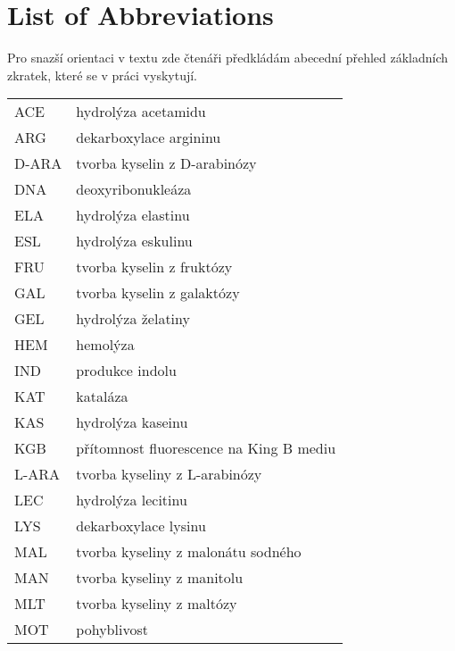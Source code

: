 \chapter*{List of Abbreviations}
\renewcommand{\chaptername}{Abbreviations}

Pro snazší orientaci v textu zde čtenáři předkládám abecední přehled základních zkratek, které se v práci vyskytují.
\begin{flushleft}
\begin{longtable}[l]{ll} %
  ACE                 & hydrolýza acetamidu \\[1mm]
  ARG                 & dekarboxylace argininu \\[1mm]
  D-ARA                 & tvorba kyselin z D-arabinózy \\[1mm]
  DNA                 & deoxyribonukleáza \\[1mm]
  ELA                 & hydrolýza elastinu \\[1mm]
  ESL                 & hydrolýza eskulinu \\[1mm]
  FRU                 & tvorba kyselin z fruktózy \\[1mm]
  GAL                 & tvorba kyselin z galaktózy \\[1mm]
  GEL                 & hydrolýza želatiny \\[1mm]
  HEM                 & hemolýza \\[1mm]
  IND                 & produkce indolu \\[1mm]
  KAT                 & kataláza \\[1mm]
  KAS                 & hydrolýza kaseinu \\[1mm]
  KGB                 & přítomnost fluorescence na King B mediu \\[1mm]
  L-ARA                 & tvorba kyseliny z L-arabinózy \\[1mm]
  LEC                 & hydrolýza lecitinu \\[1mm]
  LYS                 & dekarboxylace lysinu \\[1mm]
  MAL                 & tvorba kyseliny z malonátu sodného \\[1mm]
  MAN                 & tvorba kyseliny z manitolu \\[1mm]
  MLT                 & tvorba kyseliny z maltózy \\[1mm]
  MOT                 & pohyblivost \\[1mm]

\end{longtable}
\end{flushleft}
